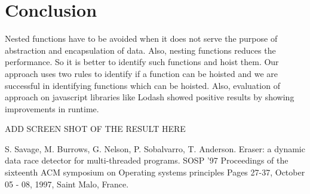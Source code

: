 \documentclass[authoryear,preprint]{sigplanconf}
\begin{document}
\section{Conclusion}
\label{sec:conclusion}
Nested functions have to be avoided when it does not serve the purpose of abstraction and encapsulation of data. Also, nesting functions reduces the performance. So it is better to identify such functions and hoist them. Our approach uses two rules to identify if a function can be hoisted and we are successful in identifying functions which can be hoisted. Also, evaluation of approach on javascript libraries like Lodash showed positive results by showing improvements in runtime.\par

ADD SCREEN SHOT OF THE RESULT HERE


\begin{thebibliography}{1}
\softraggedright
{}
S. Savage, M. Burrows, G. Nelson, P. Sobalvarro, T. Anderson. 
Eraser: a dynamic data race detector for multi-threaded programs. SOSP '97 Proceedings of the sixteenth ACM symposium on Operating systems principles
Pages 27-37, October 05 - 08, 1997, Saint Malo, France.



\end{thebibliography}
\end{document}

